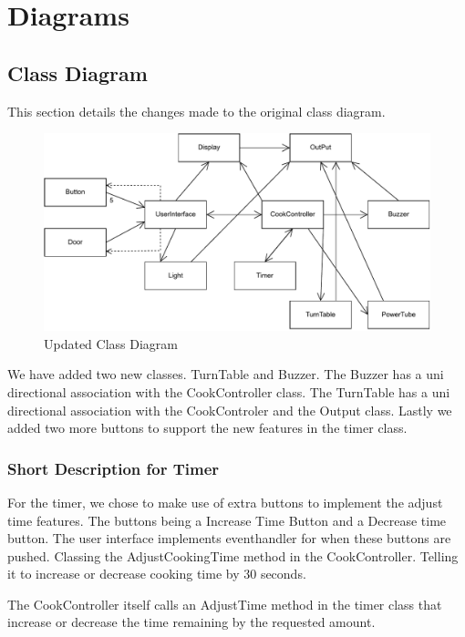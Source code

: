 \section{Diagrams}

\subsection{Class Diagram}
This section details the changes made to the original class diagram.
\begin{figure}[h]
  \centering
  \includegraphics[scale=0.66]{02-Body/Image/ClassDiagram}
  \caption{Updated Class Diagram}%
  \label{fig:ClassDiagram}
\end{figure}
We have added two new classes. TurnTable and Buzzer.
The Buzzer has a uni directional association with the CookController class.
The TurnTable has a uni directional association with the CookControler and the Output class.
Lastly we added two more buttons to support the new features in the timer class.

\subsubsection{Short Description for Timer}
For the timer, we chose to make use of extra buttons to implement the adjust time features.
The buttons being a Increase Time Button and a Decrease time button. The user interface 
implements eventhandler for when these buttons are pushed. Classing the AdjustCookingTime
method in the CookController. Telling it to increase or decrease cooking time by 30 seconds.

The CookController itself calls an AdjustTime method in the timer class that increase or decrease
the time remaining by the requested amount.


\newpage

